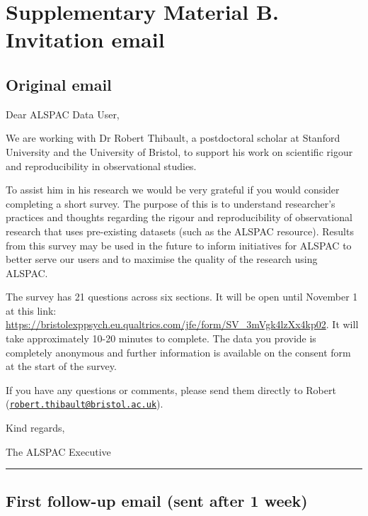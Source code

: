 \documentclass[
  man,floatsintext]{apa6}
\begin{document}
\begin{enumerate}
\end{enumerate}

\pagebreak

\hypertarget{supplementary-material-b.-invitation-email}{%
\section{Supplementary Material B. Invitation email}\label{supplementary-material-b.-invitation-email}}

\hypertarget{original-email}{%
\subsection{Original email}\label{original-email}}

Dear ALSPAC Data User,

We are working with Dr Robert Thibault, a postdoctoral scholar at Stanford University and the University of Bristol, to support his work on scientific rigour and reproducibility in observational studies.

To assist him in his research we would be very grateful if you would consider completing a short survey. The purpose of this is to understand researcher's practices and thoughts regarding the rigour and reproducibility of observational research that uses pre-existing datasets (such as the ALSPAC resource). Results from this survey may be used in the future to inform initiatives for ALSPAC to better serve our users and to maximise the quality of the research using ALSPAC.

The survey has 21 questions across six sections. It will be open until November 1 at this link: \url{https://bristolexppsych.eu.qualtrics.com/jfe/form/SV_3mVgk4lzXx4kp02}. It will take approximately 10-20 minutes to complete. The data you provide is completely anonymous and further information is available on the consent form at the start of the survey.

If you have any questions or comments, please send them directly to Robert (\href{mailto:robert.thibault@bristol.ac.uk}{\nolinkurl{robert.thibault@bristol.ac.uk}}).

Kind regards,

The ALSPAC Executive

\begin{center}\rule{0.5\linewidth}{0.5pt}\end{center}

\hypertarget{first-follow-up-email-sent-after-1-week}{%
\subsection{First follow-up email (sent after 1 week)}\label{first-follow-up-email-sent-after-1-week}}
\end{document}
